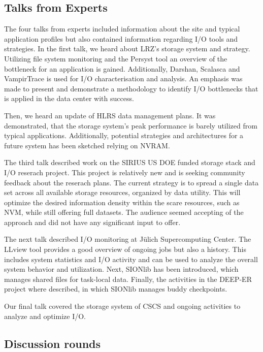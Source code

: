 \documentclass{llncs}
\begin{document}
\subsection{Talks from Experts}

The four talks from experts included information about the site and typical application profiles but also contained information regarding I/O tools and strategies. 
In the first talk, we heard about LRZ's storage system and strategy.
Utilizing file system monitoring and the Persyst tool an overview of the bottleneck for an application is gained.
Additionally, Darshan, Scalasca and VampirTrace is used for I/O characterisation and analysis.
An emphasis was made to present and demonstrate a methodology to identify I/O bottlenecks that is applied in the data center with success.

Then, we heard an update of HLRS data management plans.
It was demonstrated, that the storage system's peak performance is barely utilized from typical applications.
Additionally, potential strategies and architectures for a future system has been sketched relying on NVRAM.

The third talk described work on the SIRIUS US DOE funded storage stack and I/O reserach project. This project is relatively new and is seeking community feedback about the reserach plans. The current strategy is to spread a single data set across all available storage resources, organized by data utility. This will optimize the desired information density within the scare resources, such as NVM, while still offering full datasets. The audience seemed accepting of the approach and did not have any significant input to offer.

The next talk described I/O monitoring at Jülich Supercomputing Center.
The LLview tool provides a good overview of ongoing jobs but also a history. 
This includes system statistics and I/O activity and can be used to analyze the overall system behavior and utilization.
Next, SIONlib has been introduced, which manages shared files for task-local data.
Finally, the activities in the DEEP-ER project where described, in which SIONlib manages buddy checkpoints.

Our final talk covered the storage system of CSCS and ongoing activities to analyze and optimize I/O.


\subsection{Discussion rounds}
\end{document}
